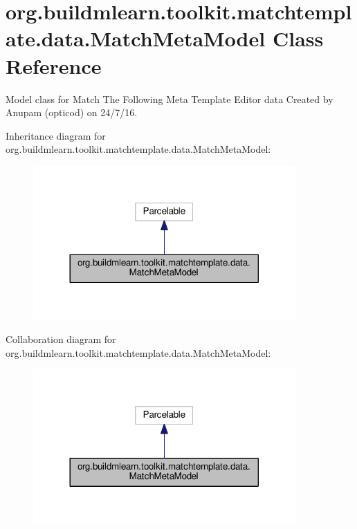 \hypertarget{classorg_1_1buildmlearn_1_1toolkit_1_1matchtemplate_1_1data_1_1MatchMetaModel}{}\section{org.\+buildmlearn.\+toolkit.\+matchtemplate.\+data.\+Match\+Meta\+Model Class Reference}
\label{classorg_1_1buildmlearn_1_1toolkit_1_1matchtemplate_1_1data_1_1MatchMetaModel}


Model class for Match The Following Meta Template Editor data Created by Anupam (opticod) on 24/7/16.  




Inheritance diagram for org.\+buildmlearn.\+toolkit.\+matchtemplate.\+data.\+Match\+Meta\+Model\+:
\nopagebreak
\begin{figure}[H]
\begin{center}
\leavevmode
\includegraphics[width=284pt]{classorg_1_1buildmlearn_1_1toolkit_1_1matchtemplate_1_1data_1_1MatchMetaModel__inherit__graph}
\end{center}
\end{figure}


Collaboration diagram for org.\+buildmlearn.\+toolkit.\+matchtemplate.\+data.\+Match\+Meta\+Model\+:
\nopagebreak
\begin{figure}[H]
\begin{center}
\leavevmode
\includegraphics[width=284pt]{classorg_1_1buildmlearn_1_1toolkit_1_1matchtemplate_1_1data_1_1MatchMetaModel__coll__graph}
\end{center}
\end{figure}
